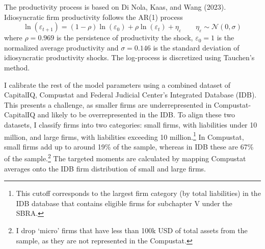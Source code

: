 \documentclass[12pt]{article}
\begin{document}
The productivity process is based on Di Nola, Kaas, and Wang (2023). Idiosyncratic firm productivity follows the AR(1) process 
$$ \ln(\varepsilon_{t+1}) = (1-\rho) \ln(\varepsilon_0) + \rho \ln(\varepsilon_t) + \eta_\varepsilon \qquad \eta_\varepsilon \sim \mathcal{N}(0,\sigma)$$ where 
$\rho = 0.969$ is the persistence of productivity the shock, $\varepsilon_0 = 1$ is the normalized average productivity and $\sigma = 0.146$ is the standard deviation of idiosyncratic productivity shocks. The log-process is discretized using Tauchen's method. 

I calibrate the rest of the model parameters using a combined dataset of CapitalIQ, Compustat and Federal Judicial Center's Integrated Database (IDB). This presents a challenge, as smaller firms are underrepresented in Compustat-CapitalIQ and likely to be overrepresented in the IDB. To align these two datasets, I classify firms into two categories: small firms, with liabilities under 10 million, and large firms, with liabilities exceeding 10 million.\footnote{This cutoff corresponds to the largest firm category (by total liabilities) in the IDB database that contains eligible firms for subchapter V under the SBRA.} In Compustat, small firms add up to around 19\% of the sample, whereas in IDB these are 67\% of the sample.\footnote{I drop `micro' firms that have less than 100k USD of total assets from the sample, as they are not represented in the Compustat.} The targeted moments are calculated by mapping Compustat averages onto the IDB firm distribution of small and large firms. 
\end{document}
